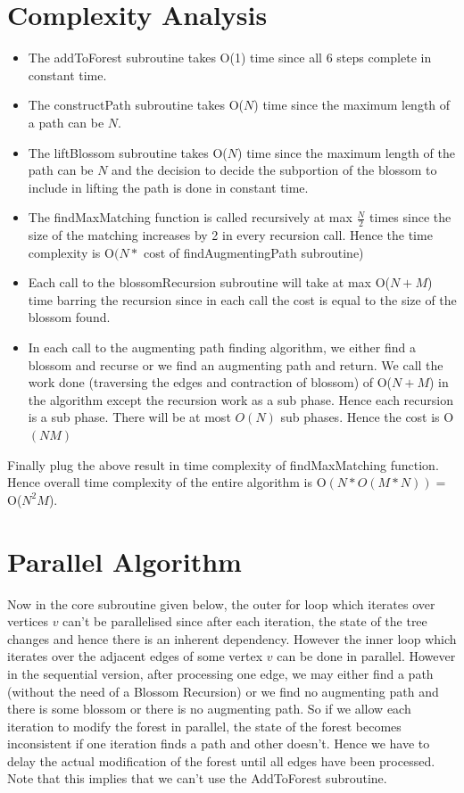\section{Complexity Analysis}
\begin{itemize}
    \item The addToForest subroutine takes O(1) time since all 6 steps complete in constant time.
    \item The constructPath subroutine takes O($N$) time since the maximum length of a path can be $N$.
    \item The liftBlossom subroutine takes O($N$) time since the maximum length of the path can be $N$ and the decision to decide the subportion of the blossom to include in lifting the path is done in constant time.
    \item The findMaxMatching function is called recursively at max $\frac{N}{2}$ times since the size of the matching increases by 2 in every recursion call. Hence the time complexity is O$(N*$ cost of findAugmentingPath subroutine)
    \item Each call to the blossomRecursion subroutine will take at max O($N+M$) time barring the recursion since in each call the cost is equal to the size of the blossom found.
    \item In each call to the augmenting path finding algorithm, we either find a blossom and recurse or we find an augmenting path and return. We call the work done (traversing the edges and contraction of blossom) of O($N+M$) in the algorithm except the recursion work as a sub phase. Hence each recursion is a sub phase. There will be at most $O(N)$ sub phases. Hence the cost is O$(NM)$
\end{itemize}

Finally plug the above result in time complexity of findMaxMatching function. Hence overall time complexity of the entire algorithm is O$(N * O(M*N)) = $ O($N^2M$).

\section{Parallel Algorithm}
Now in the core subroutine given below, the outer for loop which iterates over vertices $v$ can't be parallelised since after each iteration, the state of the tree changes and hence there is an inherent dependency. However the inner loop which iterates over the adjacent edges of some vertex $v$ can be done in parallel. However in the sequential version, after processing one edge, we may either find a path (without the need of a Blossom Recursion) or we find no augmenting path and there is some blossom or there is no augmenting path. So if we allow each iteration to modify the forest in parallel, the state of the forest becomes inconsistent if one iteration finds a path and other doesn't. Hence we have to delay the actual modification of the forest until all edges have been processed. Note that this implies that we can't use the AddToForest subroutine.

